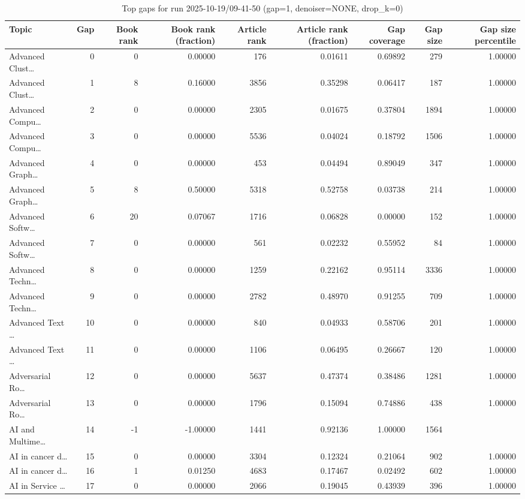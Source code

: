 \begin{table}
\caption{Top gaps for run 2025-10-19/09-41-50 (gap=1, denoiser=NONE, drop\_k=0)}
\label{tab:best_run_gap1_2025_10_19_09_41_50}
\begin{tabular}{lrrrrrrrr}
\toprule
Topic & Gap & Book rank & Book rank (fraction) & Article rank & Article rank (fraction) & Gap coverage & Gap size & Gap size percentile \\
\midrule
Advanced Clust… & 0 & 0 & 0.00000 & 176 & 0.01611 & 0.69892 & 279 & 1.00000 \\
Advanced Clust… & 1 & 8 & 0.16000 & 3856 & 0.35298 & 0.06417 & 187 & 1.00000 \\
Advanced Compu… & 2 & 0 & 0.00000 & 2305 & 0.01675 & 0.37804 & 1894 & 1.00000 \\
Advanced Compu… & 3 & 0 & 0.00000 & 5536 & 0.04024 & 0.18792 & 1506 & 1.00000 \\
Advanced Graph… & 4 & 0 & 0.00000 & 453 & 0.04494 & 0.89049 & 347 & 1.00000 \\
Advanced Graph… & 5 & 8 & 0.50000 & 5318 & 0.52758 & 0.03738 & 214 & 1.00000 \\
Advanced Softw… & 6 & 20 & 0.07067 & 1716 & 0.06828 & 0.00000 & 152 & 1.00000 \\
Advanced Softw… & 7 & 0 & 0.00000 & 561 & 0.02232 & 0.55952 & 84 & 1.00000 \\
Advanced Techn… & 8 & 0 & 0.00000 & 1259 & 0.22162 & 0.95114 & 3336 & 1.00000 \\
Advanced Techn… & 9 & 0 & 0.00000 & 2782 & 0.48970 & 0.91255 & 709 & 1.00000 \\
Advanced Text … & 10 & 0 & 0.00000 & 840 & 0.04933 & 0.58706 & 201 & 1.00000 \\
Advanced Text … & 11 & 0 & 0.00000 & 1106 & 0.06495 & 0.26667 & 120 & 1.00000 \\
Adversarial Ro… & 12 & 0 & 0.00000 & 5637 & 0.47374 & 0.38486 & 1281 & 1.00000 \\
Adversarial Ro… & 13 & 0 & 0.00000 & 1796 & 0.15094 & 0.74886 & 438 & 1.00000 \\
AI and Multime… & 14 & -1 & -1.00000 & 1441 & 0.92136 & 1.00000 & 1564 &  \\
AI in cancer d… & 15 & 0 & 0.00000 & 3304 & 0.12324 & 0.21064 & 902 & 1.00000 \\
AI in cancer d… & 16 & 1 & 0.01250 & 4683 & 0.17467 & 0.02492 & 602 & 1.00000 \\
AI in Service … & 17 & 0 & 0.00000 & 2066 & 0.19045 & 0.43939 & 396 & 1.00000 \\

\end{tabular}
\end{table}
